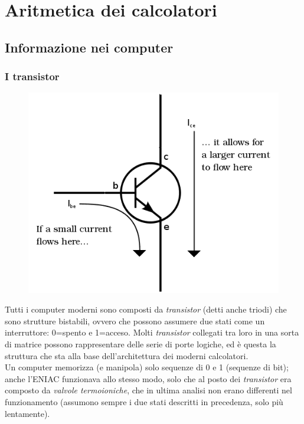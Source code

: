 \chapter{Aritmetica dei calcolatori}

\section{Informazione nei computer}

\subsection{I transistor}
\begin{figure}
	\includegraphics[width=0.9\linewidth]{images/transistor.png}
	\label{fig:transistor}
	\centering
\end{figure}
Tutti i computer moderni sono composti da \textit{transistor} (detti anche triodi) che sono strutture bistabili, ovvero che possono assumere due stati come un interruttore: 0=spento e 1=acceso. Molti \textit{transistor} collegati tra loro in una sorta di matrice possono rappresentare delle serie di porte logiche, ed è questa la struttura che sta alla base dell'architettura dei moderni calcolatori.\\ 
Un computer memorizza (e manipola) solo sequenze di 0 e 1 (sequenze di bit); anche l’ENIAC funzionava allo stesso modo, solo che al posto dei \textit{transistor} era composto da \textit{valvole termoioniche}, che in ultima analisi non erano differenti nel funzionamento (assumono sempre i due stati descritti in precedenza, solo più lentamente).
